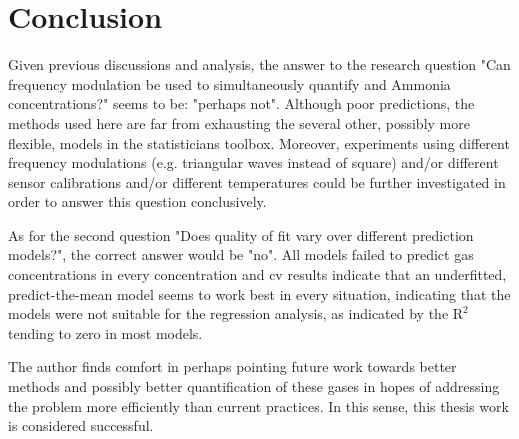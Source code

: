 
\chapter{Conclusion}
\label{cha:conclusion}

Given previous discussions and analysis, the answer to the research question "Can frequency modulation be used to simultaneously quantify \nox and Ammonia concentrations?" seems to be: "perhaps not". Although poor predictions, the methods used here are far from exhausting the several other, possibly more flexible, models in the statisticians toolbox. Moreover, experiments using different frequency modulations (e.g. triangular waves instead of square) and/or different sensor calibrations and/or different temperatures could be further investigated in order to answer this question conclusively.

As for the second question "Does quality of fit vary over different prediction models?", the correct answer would be "no". All models failed to predict gas concentrations in every concentration and \acrshort{cv} results indicate that an underfitted, predict-the-mean model seems to work best in every situation, indicating that the models were not suitable for the regression analysis, as indicated by the $\text{R}^2$ tending to zero in most models.

The author finds comfort in perhaps pointing future work towards better methods and possibly better quantification of these gases in hopes of addressing the problem more efficiently than current practices. In this sense, this thesis work is considered successful.

